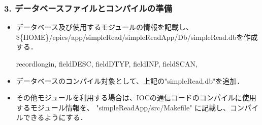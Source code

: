 \documentclass[letterpaper,10pt,dvipdfmx]{sphinxmanual}
\begin{document}
\subsubsection{3. データベースファイルとコンパイルの準備}
\label{\detokenize{epics/rst/example2__arduino_ADConvertor:id5}}\begin{itemize}
\item {} 
データベース及び使用するモジュールの情報を記載し、\$\{HOME\}/epics/app/simpleRead/simpleReadApp/Db/simpleRead.dbを作成する．
\def\sphinxLiteralBlockLabel{\label{\detokenize{epics/rst/example2__arduino_ADConvertor:id7}}}
\begin{sphinxVerbatim}[commandchars=\\\{\},numbers=left,firstnumber=1,stepnumber=1]
recordlongin,
  fieldDESC,  
  fieldDTYP, 
  fieldINP, 
  fieldSCAN, 
\end{sphinxVerbatim}

\item {} 
データベースのコンパイル対象として、上記の"simpleRead.db"を追加．

\begin{sphinxVerbatim}[commandchars=\\\{\}]
 

  
\end{sphinxVerbatim}

\item {} 
その他モジュールを利用する場合は、IOCの通信コードのコンパイルに使用するモジュール情報を、 "simpleReadApp/src/Makefile" に記載し、コンパイルできるようにする．

\begin{sphinxVerbatim}[commandchars=\\\{\}]
 

   
   
   

  
  
\end{sphinxVerbatim}

\end{itemize}
\end{document}
